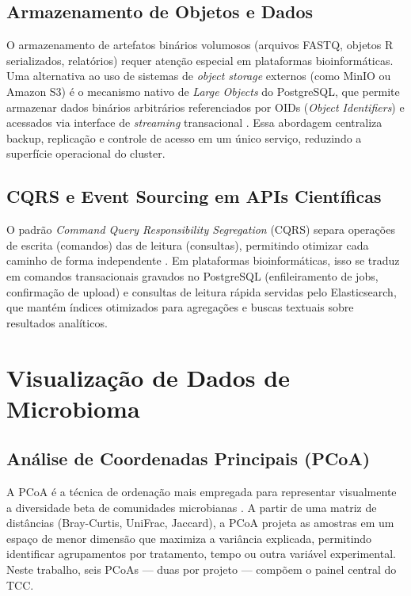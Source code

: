 \subsection{Armazenamento de Objetos e Dados}

O armazenamento de artefatos binários volumosos (arquivos FASTQ,
objetos R serializados, relatórios) requer atenção especial em
plataformas bioinformáticas. Uma alternativa ao uso de sistemas de
\textit{object storage} externos (como MinIO ou Amazon S3) é o
mecanismo nativo de \textit{Large Objects} do PostgreSQL, que permite
armazenar dados binários arbitrários referenciados por OIDs
(\textit{Object Identifiers}) e acessados via interface de
\textit{streaming} transacional \cite{postgresql2023docs}. Essa
abordagem centraliza backup, replicação e controle de acesso em um
único serviço, reduzindo a superfície operacional do cluster.

\subsection{CQRS e Event Sourcing em APIs Científicas}

O padrão \textit{Command Query Responsibility Segregation} (CQRS)
separa operações de escrita (comandos) das de leitura (consultas),
permitindo otimizar cada caminho de forma independente
\cite{young2010cqrs}. Em plataformas bioinformáticas, isso se traduz
em comandos transacionais gravados no PostgreSQL (enfileiramento de
jobs, confirmação de upload) e consultas de leitura rápida servidas
pelo Elasticsearch, que mantém índices otimizados para agregações e
buscas textuais sobre resultados analíticos.

\section{Visualização de Dados de Microbioma}

\subsection{Análise de Coordenadas Principais (PCoA)}

A PCoA é a técnica de ordenação mais empregada para representar
visualmente a diversidade beta de comunidades microbianas
\cite{legendre2012numerical}. A partir de uma matriz de distâncias
(Bray-Curtis, UniFrac, Jaccard), a PCoA projeta as amostras em um
espaço de menor dimensão que maximiza a variância explicada, permitindo
identificar agrupamentos por tratamento, tempo ou outra variável
experimental. Neste trabalho, seis PCoAs — duas por projeto — compõem
o painel central do TCC.

